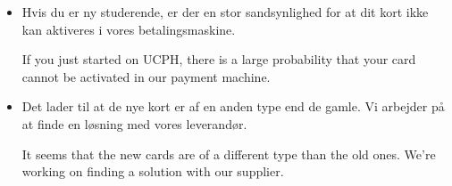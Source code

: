 \documentclass{article}
\begin{document}

\maketitle

\null

\vspace{-1.7cm}

\huge

\vspace{-1.5cm}
\english{}

\vspace{-1cm}

\begin{itemize}

\dansk

\item Hvis du er ny studerende, er der en stor sandsynlighed for at dit kort
ikke kan aktiveres i vores betalingsmaskine.

\english If you just started on UCPH, there is a large probability that your
card cannot be activated in our payment machine.

\dansk

\item Det lader til at de nye kort er af en anden type end de gamle.  Vi
arbejder på at finde en løsning med vores leverandør.

\english It seems that the new cards are of a different type than the old ones.
We're working on finding a solution with our supplier.

\end{itemize}

\dansk

\underskriv
\end{document}
